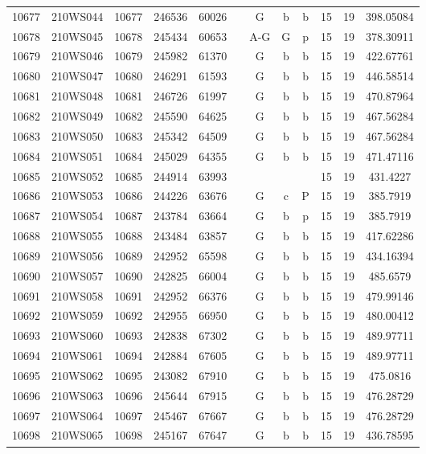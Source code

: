 \begin{tabular}{|*{12}{c|}}
10677 & 210WS044 & 10677 & 246536 & 60026 &  & G & b & b & 15 & 19 & 398.05084 \\ 
10678 & 210WS045 & 10678 & 245434 & 60653 &  & A-G & G & p & 15 & 19 & 378.30911 \\ 
10679 & 210WS046 & 10679 & 245982 & 61370 &  & G & b & b & 15 & 19 & 422.67761 \\ 
10680 & 210WS047 & 10680 & 246291 & 61593 &  & G & b & b & 15 & 19 & 446.58514 \\ 
10681 & 210WS048 & 10681 & 246726 & 61997 &  & G & b & b & 15 & 19 & 470.87964 \\ 
10682 & 210WS049 & 10682 & 245590 & 64625 &  & G & b & b & 15 & 19 & 467.56284 \\ 
10683 & 210WS050 & 10683 & 245342 & 64509 &  & G & b & b & 15 & 19 & 467.56284 \\ 
10684 & 210WS051 & 10684 & 245029 & 64355 &  & G & b & b & 15 & 19 & 471.47116 \\ 
10685 & 210WS052 & 10685 & 244914 & 63993 &  &  &  &  & 15 & 19 & 431.4227 \\ 
10686 & 210WS053 & 10686 & 244226 & 63676 &  & G & c & P & 15 & 19 & 385.7919 \\ 
10687 & 210WS054 & 10687 & 243784 & 63664 &  & G & b & p & 15 & 19 & 385.7919 \\ 
10688 & 210WS055 & 10688 & 243484 & 63857 &  & G & b & b & 15 & 19 & 417.62286 \\ 
10689 & 210WS056 & 10689 & 242952 & 65598 &  & G & b & b & 15 & 19 & 434.16394 \\ 
10690 & 210WS057 & 10690 & 242825 & 66004 &  & G & b & b & 15 & 19 & 485.6579 \\ 
10691 & 210WS058 & 10691 & 242952 & 66376 &  & G & b & b & 15 & 19 & 479.99146 \\ 
10692 & 210WS059 & 10692 & 242955 & 66950 &  & G & b & b & 15 & 19 & 480.00412 \\ 
10693 & 210WS060 & 10693 & 242838 & 67302 &  & G & b & b & 15 & 19 & 489.97711 \\ 
10694 & 210WS061 & 10694 & 242884 & 67605 &  & G & b & b & 15 & 19 & 489.97711 \\ 
10695 & 210WS062 & 10695 & 243082 & 67910 &  & G & b & b & 15 & 19 & 475.0816 \\ 
10696 & 210WS063 & 10696 & 245644 & 67915 &  & G & b & b & 15 & 19 & 476.28729 \\ 
10697 & 210WS064 & 10697 & 245467 & 67667 &  & G & b & b & 15 & 19 & 476.28729 \\ 
10698 & 210WS065 & 10698 & 245167 & 67647 &  & G & b & b & 15 & 19 & 436.78595 \\ 

\end{tabular}
